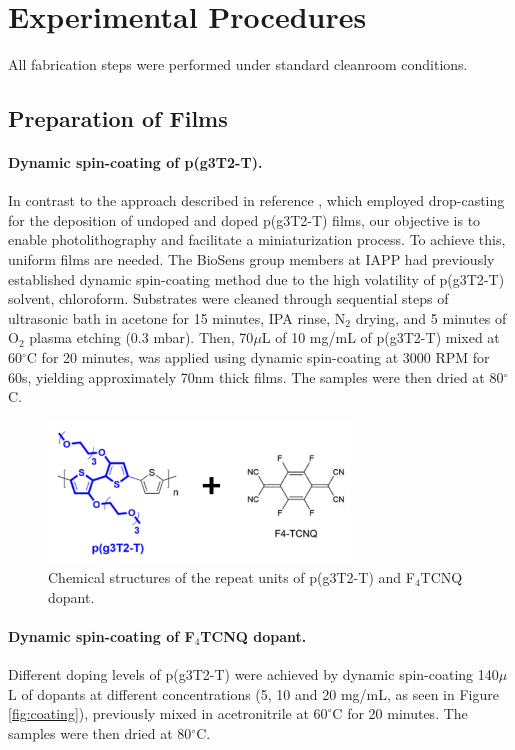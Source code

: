 \section{Experimental Procedures}

All fabrication steps were performed under standard cleanroom conditions.
\subsection{Preparation of Films} \label{subsec:films}
\paragraph{Dynamic spin-coating of p(g3T2-T).} In contrast to the approach described in reference \cite{tanTuningOrganicElectrochemical2022}, which employed drop-casting for the deposition of undoped and doped p(g3T2-T) films, our objective is to enable photolithography and facilitate a miniaturization process. To achieve this, uniform films are needed. The BioSens group members at IAPP had previously established dynamic spin-coating method due to the high volatility of p(g3T2-T) solvent, chloroform. Substrates were cleaned through sequential steps of ultrasonic bath in acetone for 15 minutes, IPA rinse, N$_{2}$ drying, and 5 minutes of O$_{2}$ plasma etching (0.3 mbar). Then, 70$\mu$L of 10 mg/mL of p(g3T2-T) mixed at 60$^{\circ}$C for 20 minutes, was applied using dynamic spin-coating at 3000 RPM for 60s, yielding approximately 70nm thick films. The samples were then dried at 80$^{\circ}$C.

\begin{figure}[ht]
  \centering
  \includegraphics[width=8cm]{Images/pdf/doping_formulas1.pdf}
  \caption{Chemical structures of the repeat units of p(g3T2-T) and F$_{4}$TCNQ dopant.}
  \label{fig:dop1}
\end{figure}

\paragraph{Dynamic spin-coating of F$_{4}$TCNQ dopant.}Different doping levels of p(g3T2-T) were achieved by dynamic spin-coating 140$\mu$L of dopants at different concentrations (5, 10 and 20 mg/mL, as seen in Figure \ref{fig:coating}), previously mixed in acetronitrile at $60^{\circ}$C for 20 minutes. The samples were then dried at 80$^{\circ}$C.

